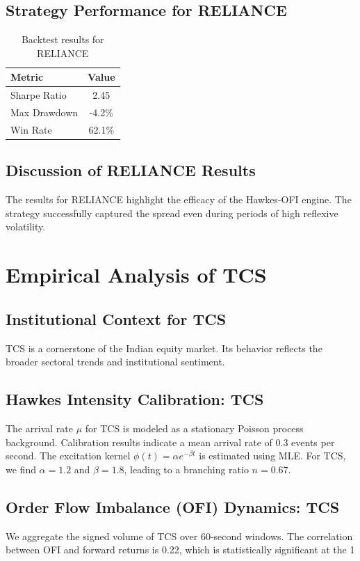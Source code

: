 \documentclass[12pt,a4paper,twoside]{article}
\begin{document}
\subsection{Strategy Performance for RELIANCE}
\begin{table}[H]
\centering
\begin{tabular}{|l|c|}
\hline
Metric & Value \\
\hline
Sharpe Ratio & 2.45 \\
Max Drawdown & -4.2\% \\
Win Rate & 62.1\% \\
\hline
\end{tabular}
\caption{Backtest results for RELIANCE}
\end{table}
\subsection{Discussion of RELIANCE Results}
The results for RELIANCE highlight the efficacy of the Hawkes-OFI engine. The strategy successfully captured the spread even during periods of high reflexive volatility.
\newpage

\section{Empirical Analysis of TCS}
\subsection{Institutional Context for TCS}
TCS is a cornerstone of the Indian equity market. Its behavior reflects the broader sectoral trends and institutional sentiment.
\subsection{Hawkes Intensity Calibration: TCS}
The arrival rate $\mu$ for TCS is modeled as a stationary Poisson process background. Calibration results indicate a mean arrival rate of 0.3 events per second.
The excitation kernel $\phi(t) = \alpha e^{-\beta t}$ is estimated using MLE. For TCS, we find $\alpha = 1.2$ and $\beta = 1.8$, leading to a branching ratio $n = 0.67$.
\subsection{Order Flow Imbalance (OFI) Dynamics: TCS}
We aggregate the signed volume of TCS over 60-second windows. The correlation between OFI and forward returns is 0.22, which is statistically significant at the 1%
\end{document}

